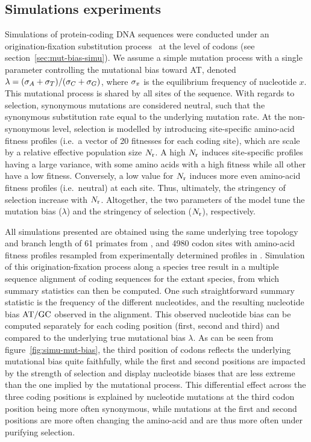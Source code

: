 \documentclass{article}
\begin{document}
\subsection{Simulations experiments}
\label{subsec:simulations-experiments}

Simulations of protein-coding {DNA} sequences were conducted under an origination-fixation {substitution} process~\citep{McCandlish2014} at the level of codons (see section~\ref{sec:mut-bias-simu}).
We assume a simple mutation process with a single parameter controlling the mutational bias toward AT, denoted $\lambda = (\sigma_A+\sigma_T)/(\sigma_C+\sigma_G)$, where $\sigma_x$ is the equilibrium frequency of nucleotide $x$.
This mutational process is shared by all sites of the sequence.
With regards to selection, {synonymous} mutations are considered {neutral}, such that the {synonymous} {substitution} rate equal to the underlying mutation rate.
At the {non-synonymous} level, selection is modelled by introducing site-specific amino-acid fitness profiles (i.e.~a vector of 20 fitnesses for each coding site), which are scale by a relative effective population size $N_{\text{r}}$.
A high $N_{\text{r}}$ induces site-specific profiles having a large variance, with some amino acids with a high fitness while all other have a low fitness.
Conversely, a low value for $N_{\text{r}}$ induces more even amino-acid fitness profiles (i.e.~neutral) at each site.
Thus, ultimately, the stringency of selection increase with $N_{\text{r}}$.
Altogether, the two parameters of the model tune the mutation bias ($\lambda$) and the stringency of selection ($N_{\text{r}}$), respectively.

All simulations presented are obtained using the same underlying tree topology and branch length of 61 primates from \citet{Perelman2011}, and 4980 codon sites with amino-acid fitness profiles resampled from experimentally determined profiles in \citet{Bloom2017}.
Simulation of this origination-fixation process along a species tree result in a multiple sequence alignment of coding sequences for the extant species, from which summary statistics can then be computed.
One such straightforward summary statistic is the frequency of the different nucleotides, and the resulting nucleotide bias $\text{AT/GC}$ observed in the alignment.
This observed nucleotide bias can be computed separately for each coding position (first, second and third) and compared to the underlying true mutational bias $\lambda$.
As can be seen from figure~\ref{fig:simu-mut-bias}, the third position of codons reflects the underlying mutational bias quite faithfully, while the first and second positions are impacted by the strength of selection and display nucleotide biases that are less extreme than the one implied by the mutational process.
This differential effect across the three coding positions is explained by nucleotide mutations at the third codon position being more often {synonymous}, while mutations at the first and second positions are more often changing the amino-acid and are thus more often under purifying selection.
\end{document}
